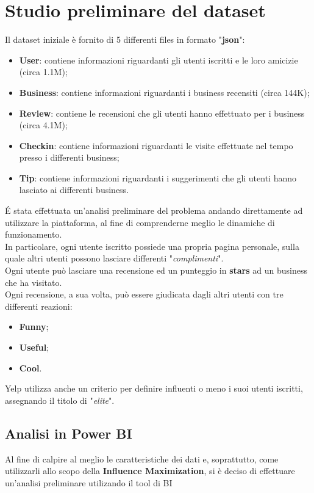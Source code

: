 
\chapter{Studio preliminare del dataset}
Il dataset iniziale è fornito di 5 differenti files in formato "\textbf{json}":
\begin{itemize}
	\item \textbf{User}: contiene informazioni riguardanti gli utenti iscritti e le loro amicizie (circa 1.1M);
	\item \textbf{Business}: contiene informazioni riguardanti i business recensiti (circa 144K);
	\item \textbf{Review}: contiene le recensioni che gli utenti hanno effettuato per i business (circa 4.1M);
	\item \textbf{Checkin}: contiene informazioni riguardanti le visite effettuate nel tempo presso i differenti business;
	\item \textbf{Tip}: contiene informazioni riguardanti i suggerimenti che gli utenti hanno lasciato ai differenti business.
\end{itemize}

\'E stata effettuata un'analisi preliminare del problema andando direttamente ad
utilizzare la piattaforma, al fine di comprenderne meglio le dinamiche di
funzionamento.\\
In particolare, ogni utente iscritto possiede una propria
pagina personale, sulla quale altri utenti possono lasciare differenti
"\textit{complimenti}".\\
Ogni utente può lasciare una recensione ed un punteggio in
\textbf{stars} ad un business che ha visitato.\\
Ogni recensione, a sua volta, può essere giudicata dagli altri utenti con tre
differenti reazioni:
\begin{itemize}
	\item \textbf{Funny};
	\item \textbf{Useful};
	\item \textbf{Cool}.
\end{itemize}
Yelp utilizza anche un criterio per definire influenti o meno i suoi utenti iscritti,
assegnando il titolo di "\textit{elite}".\\

\section{Analisi in Power BI}
Al fine di calpire al meglio le caratteristiche dei dati e, soprattutto, come
utilizzarli allo scopo della \textbf{Influence Maximization}, si è deciso di
effettuare un'analisi preliminare utilizando il tool di BI
